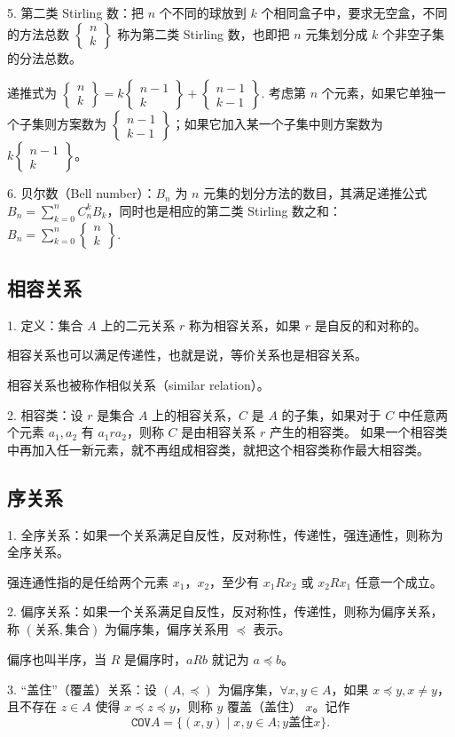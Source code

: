 \documentclass[normal,cyan]{elegantnote}
\newcommand{\stirling}[2]{\begin{Bmatrix}#1\\#2\end{Bmatrix}}
\begin{document}
5. 第二类 Stirling 数：把 $n$ 个不同的球放到 $k$ 个相同盒子中，要求无空盒，不同的方法总数 $\stirling{n}{k}$ 称为第二类 Stirling 数，也即把 $n$ 元集划分成 $k$ 个非空子集的分法总数。

递推式为 $\stirling{n}{k} = k\stirling{n - 1}{k} + \stirling{n - 1}{k - 1}.$ 考虑第 $n$ 个元素，如果它单独一个子集则方案数为 $\stirling{n - 1}{k - 1}$；如果它加入某一个子集中则方案数为 $k\stirling{n - 1}{k}$。

6. 贝尔数（Bell number）：$B_n$ 为 $n$ 元集的划分方法的数目，其满足递推公式 $B_n = \sum\limits_{k = 0}^n C_n^k B_k$，同时也是相应的第二类 Stirling 数之和：$B_n = \sum\limits_{k = 0}^n \stirling{n}{k}.$

\subsection{相容关系}
1. 定义：集合 $A$ 上的二元关系 $r$ 称为{\color{red}相容关系}，如果 $r$ 是自反的和对称的。
\begin{note}
    相容关系也可以满足{\color{red}传递性}，也就是说，等价关系也是相容关系。

    相容关系也被称作{\color{red}相似关系}（similar relation）。
\end{note}
2. 相容类：设 $r$ 是集合 $A$ 上的相容关系，$C$ 是 $A$ 的子集，如果对于 $C$ 中任意两个元素 $a_1, a_2$ 有 $a_1 r a_2$，则称 $C$ 是由相容关系 $r$ 产生的{\color{red}相容类}。
如果一个相容类中再加入{\color{red}任一新元素}，就不再组成相容类，就把这个相容类称作{\color{red}最大相容类}。

\subsection{序关系}
1. 全序关系：如果一个关系满足{\color{red}自反性，反对称性，传递性，强连通性}，则称为{\color{red}全序关系}。
\begin{note}
    强连通性指的是任给两个元素 $x_1$，$x_2$，至少有 $x_1 R x_2$ 或 $x_2 R x_1$ 任意一个成立。
\end{note}
2. 偏序关系：如果一个关系满足{\color{red}自反性，反对称性，传递性}，则称为{\color{red}偏序关系}，称 $(\text{关系}, \text{集合})$ 为{\color{red}偏序集}，偏序关系用 $\preccurlyeq$ 表示。
\begin{note}
    偏序也叫{\color{red}半序}，当 $R$ 是偏序时，$aRb$ 就记为 $a \preccurlyeq b$。
\end{note}
3. “盖住”（覆盖）关系：设 $(A, \preccurlyeq)$ 为偏序集，$\forall x, y \in A$，如果 $x \preccurlyeq y, x \neq y$，且不存在 $z \in A$ 使得 $x \preccurlyeq z \preccurlyeq y$，则称 $y$ {\color{red}覆盖（盖住）} $x$。记作 $$\mathtt{COV} A = \{(x, y) \mid x, y \in A;y \text{盖住} x\}.$$
\end{document}
